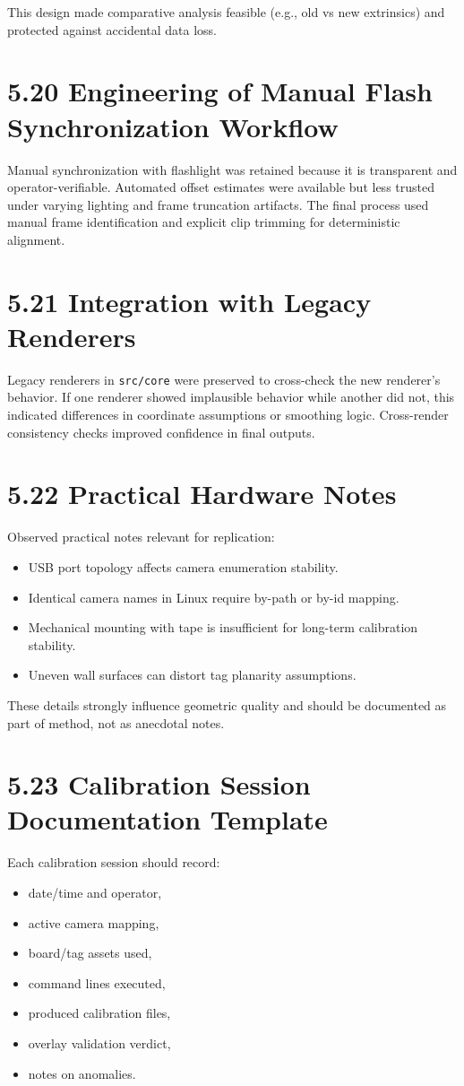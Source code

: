 This design made comparative analysis feasible (e.g., old vs new extrinsics) and protected against accidental data loss.

\section{5.20 Engineering of Manual Flash Synchronization Workflow}
Manual synchronization with flashlight was retained because it is transparent and operator-verifiable. Automated offset estimates were available but less trusted under varying lighting and frame truncation artifacts. The final process used manual frame identification and explicit clip trimming for deterministic alignment.

\section{5.21 Integration with Legacy Renderers}
Legacy renderers in \texttt{src/core} were preserved to cross-check the new renderer's behavior. If one renderer showed implausible behavior while another did not, this indicated differences in coordinate assumptions or smoothing logic. Cross-render consistency checks improved confidence in final outputs.

\section{5.22 Practical Hardware Notes}
Observed practical notes relevant for replication:
\begin{itemize}
  \item USB port topology affects camera enumeration stability.
  \item Identical camera names in Linux require by-path or by-id mapping.
  \item Mechanical mounting with tape is insufficient for long-term calibration stability.
  \item Uneven wall surfaces can distort tag planarity assumptions.
\end{itemize}

These details strongly influence geometric quality and should be documented as part of method, not as anecdotal notes.



\section{5.23 Calibration Session Documentation Template}
Each calibration session should record:
\begin{itemize}
  \item date/time and operator,
  \item active camera mapping,
  \item board/tag assets used,
  \item command lines executed,
  \item produced calibration files,
  \item overlay validation verdict,
  \item notes on anomalies.
\end{itemize}

